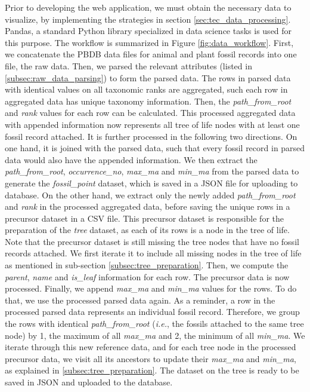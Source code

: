 \documentclass[11pt, a4paper,oneside,chapterprefix=false]{scrbook}
\begin{document}
Prior to developing the web application, we must obtain the necessary data to visualize, by implementing the strategies in section \ref{sec:tec_data_processing}. Pandas, a standard Python library specialized in data science tasks is used for this purpose. The workflow is summarized in Figure \ref{fig:data_workflow}.  First, we concatenate the PBDB \cite{peters2016paleobiology} data files for animal and plant fossil records into one file, the raw data. Then, we parsed the relevant attributes (listed in \ref{subsec:raw_data_parsing}) to form the parsed data. The rows in parsed data with identical values on all taxonomic ranks are aggregated, such each row in aggregated data has unique taxonomy information. Then, the \emph{path\_from\_root} and \emph{rank} values for each row can be calculated. This processed aggregated data with appended information now represents all tree of life nodes with at least one fossil record attached. It is further processed in the following two directions. On one hand, it is joined with the parsed data, such that every fossil record in parsed data would also have the appended information. We then extract the \emph{path\_from\_root}, \emph{occurrence\_no}, \emph{max\_ma} and \emph{min\_ma} from the parsed data to generate the \emph{fossil\_point} dataset, which is saved in a JSON file for uploading to database. On the other hand, we extract only the newly added \emph{path\_from\_root} and \emph{rank} in the processed aggregated data, before saving the unique rows in a precursor dataset in a CSV file. This precursor dataset is responsible for the preparation of the \emph{tree} dataset, as each of its rows is a node in the tree of life. Note that the precursor dataset is still missing the tree nodes that have no fossil records attached. We first iterate it to include all missing nodes in the tree of life as mentioned in sub-section \ref{subsec:tree_preparation}. Then, we compute the \emph{parent}, \emph{name} and \emph{is\_leaf} information for each row. The precursor data is now processed. Finally, we append \emph{max\_ma} and \emph{min\_ma} values for the rows. To do that, we use the processed parsed data again. As a reminder, a row in the processed parsed data represents an individual fossil record. Therefore, we group the rows with identical \emph{path\_from\_root} (\emph{i.e.}, the fossils attached to the same tree node) by 1, the maximum of all \emph{max\_ma} and 2, the minimum of all \emph{min\_ma}. We iterate through this new reference data, and for each tree node in the processed precursor data, we visit all its ancestors to update their \emph{max\_ma} and \emph{min\_ma}, as explained in \ref{subsec:tree_preparation}. The dataset on the tree is ready to be saved in JSON and uploaded to the database. \\
\end{document}
